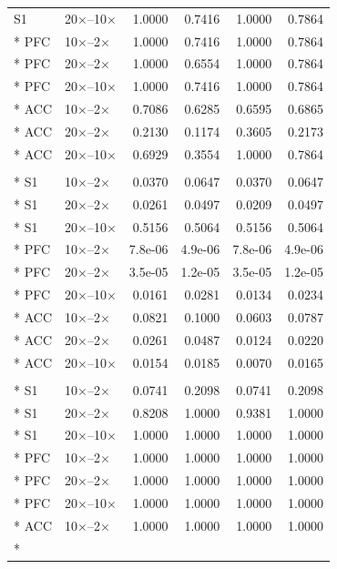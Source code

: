 \begin{longtable}{llrrrr}
S1 & 20$\times$--10$\times$ & 1.0000 & 0.7416 & 1.0000 & 0.7864 \\*
PFC & 10$\times$--2$\times$ & 1.0000 & 0.7416 & 1.0000 & 0.7864 \\*
PFC & 20$\times$--2$\times$ & 1.0000 & 0.6554 & 1.0000 & 0.7864 \\*
PFC & 20$\times$--10$\times$ & 1.0000 & 0.7416 & 1.0000 & 0.7864 \\*
ACC & 10$\times$--2$\times$ & 0.7086 & 0.6285 & 0.6595 & 0.6865 \\*
ACC & 20$\times$--2$\times$ & 0.2130 & 0.1174 & 0.3605 & 0.2173 \\*
ACC & 20$\times$--10$\times$ & 0.6929 & 0.3554 & 1.0000 & 0.7864 \\
\addlinespace
\multicolumn{6}{l}{\textbf{Evoked fraction}} \\*
S1 & 10$\times$--2$\times$ & 0.0370 & 0.0647 & 0.0370 & 0.0647 \\*
S1 & 20$\times$--2$\times$ & 0.0261 & 0.0497 & 0.0209 & 0.0497 \\*
S1 & 20$\times$--10$\times$ & 0.5156 & 0.5064 & 0.5156 & 0.5064 \\*
PFC & 10$\times$--2$\times$ & 7.8e-06 & 4.9e-06 & 7.8e-06 & 4.9e-06 \\*
PFC & 20$\times$--2$\times$ & 3.5e-05 & 1.2e-05 & 3.5e-05 & 1.2e-05 \\*
PFC & 20$\times$--10$\times$ & 0.0161 & 0.0281 & 0.0134 & 0.0234 \\*
ACC & 10$\times$--2$\times$ & 0.0821 & 0.1000 & 0.0603 & 0.0787 \\*
ACC & 20$\times$--2$\times$ & 0.0261 & 0.0487 & 0.0124 & 0.0220 \\*
ACC & 20$\times$--10$\times$ & 0.0154 & 0.0185 & 0.0070 & 0.0165 \\
\addlinespace
\multicolumn{6}{l}{\textbf{Aperiodic exponent}} \\*
S1 & 10$\times$--2$\times$ & 0.0741 & 0.2098 & 0.0741 & 0.2098 \\*
S1 & 20$\times$--2$\times$ & 0.8208 & 1.0000 & 0.9381 & 1.0000 \\*
S1 & 20$\times$--10$\times$ & 1.0000 & 1.0000 & 1.0000 & 1.0000 \\*
PFC & 10$\times$--2$\times$ & 1.0000 & 1.0000 & 1.0000 & 1.0000 \\*
PFC & 20$\times$--2$\times$ & 1.0000 & 1.0000 & 1.0000 & 1.0000 \\*
PFC & 20$\times$--10$\times$ & 1.0000 & 1.0000 & 1.0000 & 1.0000 \\*
ACC & 10$\times$--2$\times$ & 1.0000 & 1.0000 & 1.0000 & 1.0000 \\*

\end{longtable}
